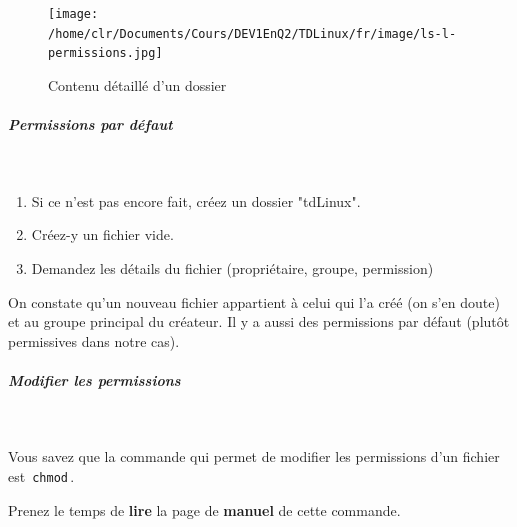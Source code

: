 \documentclass[11pt,a4paper]{article}
\begin{document}
            \par
        \begin{figure}[hbt]
				    \begin{center}
					\texttt{[image: /home/clr/Documents/Cours/DEV1EnQ2/TDLinux/fr/image/ls-l-permissions.jpg]}
						\end{center}
                
                    \caption[Contenu d\'etaill\'e d'un dossier]{Contenu d\'etaill\'e d'un dossier}
                \end{figure}
                    \clearpage
			
		\subparagraph{Permissions par d\'efaut} 
		
					\textcolor{white}{.} \par
				
            \par
        
					\begin{enumerate}
				
			\item Si ce n'est pas encore fait, cr\'eez un dossier "tdLinux".
			\item Cr\'eez-y un fichier vide.
			\item Demandez les d\'etails du fichier (propri\'etaire, groupe, permission)
					\end{enumerate}
				 
					On constate qu'un nouveau fichier appartient \`a celui qui l'a cr\'e\'e 
					(on s'en doute) et au groupe principal du cr\'eateur. 
					Il y a aussi des permissions par d\'efaut (plut\^ot permissives dans notre cas).  
				
            \par
        
			
		\subparagraph{Modifier les permissions} 
		
					\textcolor{white}{.} \par
				
            \par
          
					Vous savez que la commande qui permet de modifier les permissions d'un fichier est 
					\,\verb|chmod|\,.  
				
            \par
          
					Prenez le temps de \textbf{lire} 
					la page de \textbf{manuel} de cette commande.   
				
            \par
        
\end{document}
